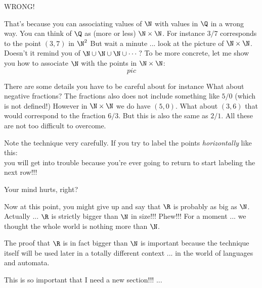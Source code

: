 WRONG!

That's because you can associating values of $\N$ with values in $\Q$
in a wrong way.
You can think of $\Q$ as (more or less) $\N \times \N$.
For instance $3/7$ corresponds to the point $(3, 7)$ in $\N^2$
But wait a minute ... look at the picture of $\N \times \N$.
Doesn't it remind you of $\N \cup \N \cup \N \cup \cdots$?
To be more concrete, let me show you how to associate $\N$ with
the points in $\N \times \N$:
\[
pic
\]

There are some details you have to be careful about for instance
What about negative fractions?
The fractions also does not include something like $5/0$
(which is not defined!)
However in $\N \times \N$ we do have $(5, 0)$.
What about $(3, 6)$ that would correspond to the fraction $6/3$.
But this is also the same as $2/1$.
All these are not too difficult to overcome.

Note the technique very carefully.
If you try to label the points \textit{horizontally} like this:
\[
\]
you will get into trouble because you're ever going to return to 
start labeling the next row!!!

Your mind hurts, right?



Now at this point, you might give up and say that $\R$ is probably
as big as $\N$.
Actually ... $\R$ is strictly bigger than $\N$ in size!!!
Phew!!! For a moment ... we thought the whole world is nothing more than
$\N$.

The proof that $\R$ is in fact bigger than $\N$ is important 
because the technique itself will be used later in a totally different
context ... in the world of languages and automata.

This is so important that I need a new section!!! ...
